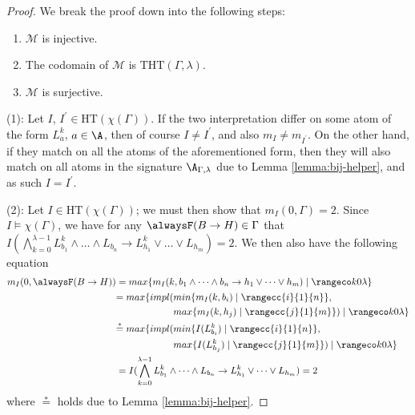 \begin{proof} We break the proof down into the following steps:
  \begin{enumerate}[label={(\arabic*)}]
    \setlength\itemsep{0.15em}
  \item $\mathcal{M}$ is injective.
  \item The codomain of $\mathcal{M}$ is $\text{THT}(\Gamma,\lambda)$.
  \item $\mathcal{M}$ is surjective.
  \end{enumerate}


  (1): Let $I$, $I^{\prime} \in \text{HT}(\chi(\Gamma))$. If the two
  interpretation differ on some atom of the form $L^k_a$, $a \in \A$,
  then of course $I \neq I^{\prime}$, and also
  $m_I \neq m_{I^{\prime}}$. On the other hand, if they match on all
  the atoms of the aforementioned form, then they will also match on
  all atoms in the signature $\A_{\Gamma,\lambda}$ due to Lemma
  \ref{lemma:bij-helper}, and as such $I = I^{\prime}$.

  (2): Let $I \in \text{HT}(\chi(\Gamma))$; we must then show that
  $m_I(0,\Gamma) = 2$. Since $I \models \chi(\Gamma)$, we have for any
  $\tempruleshort \in \Gamma$ that
  $I(\bigwedge_{k=0}^{\lambda-1} L_{b_1}^k \land \dots \land L_{b_n}
  \rightarrow L_{h_1}^k \lor \dots \lor L_{h_m})=2$. We then also have the following equation
  \begin{align*}
  m_I(0,\tempruleshort) &= max\{ m_I(k, \lrulelong ) \mid \kinlambda \}\\
  &\begin{aligned} = max\{ impl(&min\{ m_I(k,b_i) \mid \rangecc{i}{1}{n} \},\\
                               &max\{ m_I(k,h_j) \mid \rangecc{j}{1}{m} \}) \mid \kinlambda \}\end{aligned}\\
  &\begin{aligned} \stackrel{*}{=} max\{ impl(&min\{ I(L^k_{b_i}) \mid \rangecc{i}{1}{n} \},\\
                                &max\{ I(L^k_{h_j}) \mid \rangecc{j}{1}{m} \}) \mid \kinlambda \}\end{aligned}\\
  &= I(\bigwedge_{k=0}^{\lambda-1} L_{b_1}^k \land \dots \land L_{b_n} \rightarrow L_{h_1}^k \lor \dots \lor L_{h_m}) = 2
  \end{align*}
  where $\stackrel{*}=$ holds due to Lemma \ref{lemma:bij-helper}.


\end{proof}
